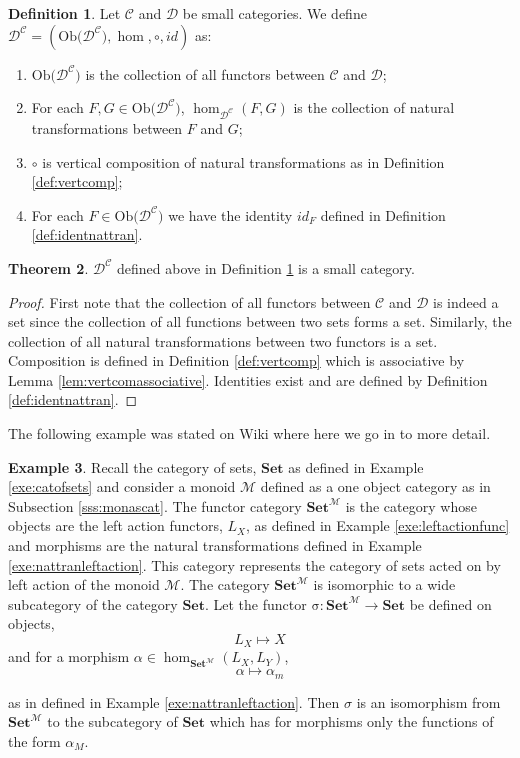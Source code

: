 \documentclass[11pt,a4paper]{article}
\theoremstyle{definition}
\newtheorem{thm}{Theorem}[section]
\newtheorem{definition}[thm]{Definition}
\newtheorem{example}[thm]{Example}
\newcommand\ho[3][]{\hom_{#1}(#2,#3)}
\newcommand\ob[1]{\mathrm{Ob(}#1\mathrm{)}}
\newcommand\cat[1]{\mathscr{#1}}
\newcommand\func[3]{\mathrm{#1}\colon#2\rightarrow#3}
\numberwithin{equation}{section}
\begin{document}
\begin{definition}
    \label{def:functorcat}
    Let $\cat{C}$ and $\cat{D}$ be small categories. We define $\cat{D}^{\cat{C}}=(\ob{\cat{D}^{\cat{C}}},\hom,\circ,id)$ as:
    \begin{enumerate}
        \item $\ob{\cat{D}^{\cat{C}}}$ is the collection of all functors between $\cat{C}$ and $\cat{D}$;
        \item For each $F,G\in\ob{\cat{D}^{\cat{C}}}$, $\ho[\cat{D}^{\cat{C}}]{F}{G}$ is the collection of natural transformations between $F$ and $G$;
        \item $\circ$ is vertical composition of natural transformations as in Definition \ref{def:vertcomp};
        \item For each $F\in\ob{\cat{D}^{\cat{C}}}$ we have the identity $id_{F}$ defined in Definition \ref{def:identnattran}.
    \end{enumerate}
\end{definition}

\begin{thm}
\label{thm:functorcat}
$\cat{D}^{\cat{C}}$ defined above in Definition \ref{def:functorcat} is a small category.
\end{thm}
\begin{proof}
First note that the collection of all functors between $\cat{C}$ and $\cat{D}$ is indeed a set since the collection of all functions between two sets forms a set. Similarly, the collection of all natural transformations between two functors is a set. Composition is defined in Definition \ref{def:vertcomp} which is associative by Lemma \ref{lem:vertcomassociative}. Identities exist and are defined by Definition \ref{def:identnattran}.
\end{proof}

The following example was stated on Wiki \cite{wiki:functorcat} where here we go in to more detail.
\begin{example}
    \label{exe:leftsetfunctcat}
    Recall the category of sets, $\mathbf{Set}$ as defined in Example \ref{exe:catofsets} and consider a monoid $\cat{M}$ defined as a one object category as in Subsection \ref{sss:monascat}. The functor category $\mathbf{Set}^{\cat{M}}$ is the category whose objects are the left action functors, $L_{X}$, as defined in Example \ref{exe:leftactionfunc} and morphisms are the natural transformations defined in Example \ref{exe:nattranleftaction}. This category represents the category of sets acted on by left action of the monoid $\cat{M}$. The category $\mathbf{Set}^{\cat{M}}$ is isomorphic to a wide subcategory of the category $\mathbf{Set}$. Let the functor $\func{\sigma}{\mathbf{Set}^{\cat{M}}}{\mathbf{Set}}$ be defined on objects,
    \[L_{X} \mapsto X\]
    and for a morphism $\alpha\in\ho[\mathbf{Set}^{\cat{M}}]{L_{X}}{L_{Y}}$,
    \[\alpha \mapsto \alpha_{m}\]
    
    as in defined in Example \ref{exe:nattranleftaction}. Then $\sigma$ is an isomorphism from $\mathbf{Set}^{\cat{M}}$ to the subcategory of $\mathbf{Set}$ which has for morphisms only the functions of the form $\alpha_M$. 
\end{example}
\pagebreak
\end{document}

